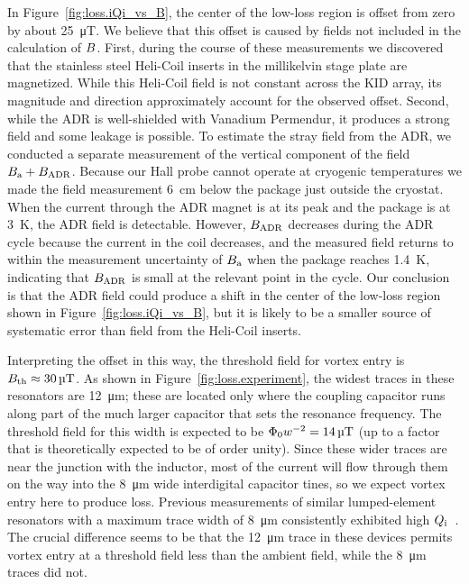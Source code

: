 In Figure~\ref{fig:loss.iQi_vs_B}, the center of the low-loss region is offset from zero by about \SI{25}{\micro T}.
We believe that this offset is caused by fields not included in the calculation of $B$.
First, during the course of these measurements we discovered that the stainless steel Heli-Coil inserts in the millikelvin stage plate are magnetized.
While this Heli-Coil field is not constant across the KID array, its magnitude and direction approximately account for the observed offset.
Second, while the ADR is well-shielded with Vanadium Permendur, it produces a strong field and some leakage is possible.
To estimate the stray field from the ADR, we conducted a separate measurement of the vertical component of the field $B_{\mathrm{a}} + B_{\mathrm{ADR}}$.
Because our Hall probe cannot operate at cryogenic temperatures we made the field measurement \SI{6}{cm} below the package just outside the cryostat.
When the current through the ADR magnet is at its peak and the package is at \SI{3}{K}, the ADR field is detectable. %
However, $B_{\mathrm{ADR}}$ decreases during the ADR cycle because the current in the coil decreases, and the measured field returns to within the measurement uncertainty of $B_{\mathrm{a}}$ when the package reaches \SI{1.4}{K}, indicating that $B_{\mathrm{ADR}}$ is small at the relevant point in the cycle.
Our conclusion is that the ADR field could produce a shift in the center of the low-loss region shown in Figure~\ref{fig:loss.iQi_vs_B}, but it is likely to be a smaller source of systematic error than field from the Heli-Coil inserts.

Interpreting the offset in this way, the threshold field for vortex entry is $B_{\mathrm{th}} \approx \SI{30}{\micro T}$.
As shown in Figure~\ref{fig:loss.experiment}, the widest traces in these resonators are \SI{12}{\micro m}; these are located only where the coupling capacitor runs along part of the much larger capacitor that sets the resonance frequency.
The threshold field for this width is expected to be $\Phi_0 w^{-2} = \SI{14}{\micro T}$ (up to a factor that is theoretically expected to be of order unity).
Since these wider traces are near the junction with the inductor, most of the current will flow through them on the way into the \SI{8}{\micro m} wide interdigital capacitor tines, so we expect vortex entry here to produce loss.
Previous measurements of similar lumped-element resonators with a maximum trace width of \SI{8}{\micro m} consistently exhibited high $Q_{\mathrm{i}}$~\autocite{McCarrick2014RSI}.
The crucial difference seems to be that the \SI{12}{\micro m} trace in these devices permits vortex entry at a threshold field less than the ambient field, while the \SI{8}{\micro m} traces did not.

